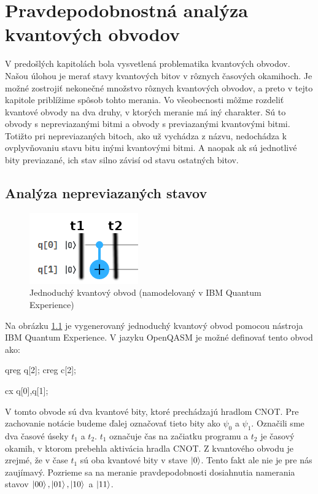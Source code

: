 
\chapter{Pravdepodobnostná analýza kvantových obvodov}
\label{pravAnalL}

V predošlých kapitolách bola vysvetlená problematika kvantových obvodov.
Našou úlohou je merať stavy kvantových bitov v rôznych časových okamihoch.
Je možné zostrojiť nekonečné množstvo rôznych kvantových obvodov,
a preto v tejto kapitole priblížime spôsob tohto merania.
Vo všeobecnosti môžme rozdeliť kvantové obvody na dva druhy, v ktorých 
meranie má iný charakter. Sú to obvody s nepreviazanými bitmi a obvody s 
previazanými kvantovými bitmi. Totižto pri nepreviazaných bitoch,
ako už vychádza z názvu, nedochádza k ovplyvňovaniu stavu bitu inými 
kvantovými bitmi. A naopak ak sú jednotlivé bity previazané, ich stav silno
závisí od stavu ostatných bitov.

\section{Analýza nepreviazaných stavov}

\begin{figure} 
	\centering 
	\includegraphics[width=.4\textwidth]{figures/simpleCircuit2.png} 
	\caption{Jednoduchý kvantový obvod (namodelovaný v IBM Quantum Experience)}
    \label{obvod}
\end{figure}

Na obrázku \ref{obvod} je vygenerovaný jednoduchý kvantový obvod pomocou
nástroja IBM Quantum Experience. V jazyku OpenQASM je možné definovať tento
obvod ako:
\begin{code}
qreg q[2];
creg c[2];

cx q[0],q[1];
\end{code}

V tomto obvode sú dva kvantové bity, ktoré prechádzajú 
hradlom CNOT. Pre zachovanie notácie budeme ďalej označovať tieto bity ako 
\(\psi_0\) a \(\psi_1\). Označili sme dva časové úseky \(t_1\) a \(t_2\).
\(t_1\) označuje čas na začiatku programu a \(t_2\) je časový okamih, v ktorom
prebehla aktivácia hradla CNOT.
 Z kvantového obvodu je zrejmé, že v čase \(t_1\) 
sú oba kvantové bity v stave
\(\ket{0}\). Tento fakt ale nie je pre nás zaujímavý. Pozrieme sa na meranie 
pravdepodobnosti dosiahnutia  
namerania stavov \(\ket{00}, \ket{01}, \ket{10}\) a \(\ket{11}\).


